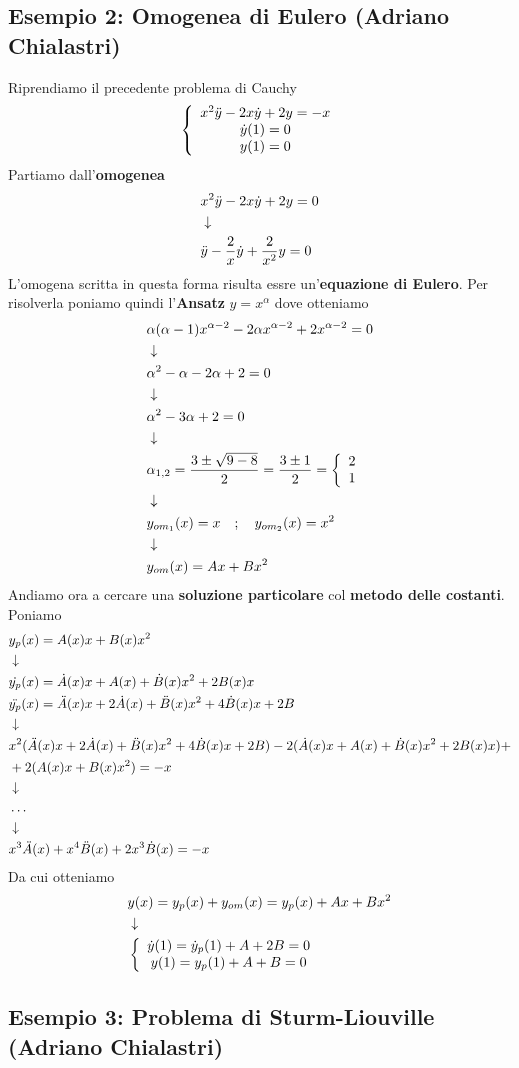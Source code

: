 \subsection{Esempio 2: Omogenea di Eulero (Adriano Chialastri)}
Riprendiamo il precedente problema di Cauchy
\begin{align}
	\left\{ \begin{array}{ccc} x^2 \ddot{y} - 2x \dot{y} + 2y = -x\\ \dot{y}(1)=0\\ y(1)=0 \end{array} \right.
\end{align}
Partiamo dall'\textbf{omogenea}
\begin{align}
	&x^2 \ddot{y} - 2x\dot{y} + 2y = 0 \\ &\downarrow \nonumber \\
	&\ddot{y} - \frac{2}{x}\dot{y} + \frac{2}{x^2}y = 0
\end{align}
L'omogena scritta in questa forma risulta essre un'\textbf{equazione di Eulero}. Per risolverla poniamo quindi l'\textbf{Ansatz} $y=x^\alpha$ dove otteniamo
\begin{align}
	&\alpha(\alpha -1) x^{\alpha-2} - 2 \alpha x^{\alpha-2} + 2x^{\alpha-2} = 0 \\ &\downarrow \nonumber \\
	&\alpha^2 - \alpha - 2\alpha +2 =0 \nonumber \\ &\downarrow \nonumber \\
	&\alpha^2 - 3\alpha +2 =0 \nonumber \\ &\downarrow \nonumber \\
	&\alpha_{1,2} = \frac{3 \pm \sqrt{9-8}}{2} = \frac{3\pm 1}{2} = \left\{ \begin{array}{cc} 2\\ 1 \end{array} \right. \nonumber \\ &\downarrow \nonumber \\
	&y_{{om}_1}(x) = x \quad ; \quad y_{{om}_2}(x) = x^2 \nonumber \\ &\downarrow \nonumber \\
	&y_{om}(x) = Ax + Bx^2   
\end{align}
Andiamo ora a cercare una \textbf{soluzione particolare} col \textbf{metodo delle costanti}. Poniamo
\begin{align}
	&y_p(x) = A(x)x + B(x)x^2 \\ &\downarrow \nonumber \\
	&\dot{y_p}(x)  = \dot{A}(x)x+ A(x) + \dot{B}(x) x^2 + 2B(x)x\\
	&\ddot{y_p}(x) = \ddot{A}(x)x+ 2\dot{A}(x) + \ddot{B}(x) x^2 + 4\dot{B}(x)x + 2B  \\ &\downarrow \nonumber \\
	&x^2 (\ddot{A}(x)x+ 2\dot{A}(x) + \ddot{B}(x) x^2 + 4\dot{B}(x)x + 2B) -2 (\dot{A}(x)x+ A(x) + \dot{B}(x) x^2 + 2B(x)x) + \nonumber \\
	&+2(A(x)x + B(x)x^2) = -x  \nonumber \\ &\downarrow \nonumber \\
	&\dots \nonumber \\ &\downarrow \nonumber \\
	&x^3 \ddot{A}(x) + x^4 \ddot{B}(x) + 2x^3 \dot{B}(x) = -x
\end{align}
Da cui otteniamo
\begin{align}
	&y(x) = y_p(x) + y_{om}(x) = y_p(x) + Ax + Bx^2 \\ &\downarrow \nonumber \\
	&\left\{ \begin{array}{cc} \dot{y}(1) = \dot{y}_p(1) + A + 2B = 0\\ y(1) = y_p(1) + A + B=0 \end{array} \right.
\end{align}

\newpage

\subsection{Esempio 3: Problema di Sturm-Liouville (Adriano Chialastri)}

